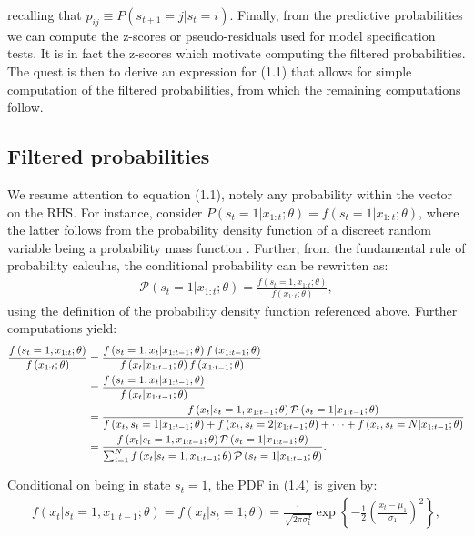 \documentclass[11pt,a4paper,oneside]{article}
\newcommand{\lp}{\left(}
\newcommand{\rp}{\right)}
\newcommand{\lc}{\left\{}
\newcommand{\rc}{\right\}}
\newcommand{\pp}{\mathcal{P}}
\begin{document}
recalling that $p_{ij} \equiv P\lp s_{t+1} = j \vert s_t = i\rp$. Finally, from the predictive probabilities we can compute the z-scores or pseudo-residuals used for model specification tests. It is in fact the z-scores which motivate computing the filtered probabilities. The quest is then to derive an expression for (1.1) that allows for simple computation of the filtered probabilities, from which the remaining computations follow.

\subsection{Filtered probabilities}
We resume attention to equation (1.1), notely any probability within the vector on the RHS. For instance, consider $P\lp s_t = 1\vert x_{1:t};\theta\rp = f\lp s_t = 1\vert x_{1:t};\theta\rp$, where the latter follows from the probability density function of a discreet random variable being a probability mass function \cite{grimmet}. Further, from the fundamental rule of probability calculus, the conditional probability can be rewritten as:
\begin{align}
    \pp\lp s_t = 1\vert x_{1:t};\theta\rp = \frac{f\lp s_t = 1, x_{1:t};\theta\rp}{ f\lp x_{1:t};\theta\rp},
\end{align}
using the definition of the probability density function referenced above. Further computations yield:
\begin{align}
    \frac{f\lp s_t = 1, x_{1:t};\theta\rp}{ f\lp x_{1:t};\theta\rp} 
        &= \frac{f\lp s_t = 1, x_t\vert x_{1:t-1};\theta\rp f\lp x_{1:t-1};\theta\rp}{ f\lp x_t\vert x_{1:t-1};\theta\rp f\lp x_{1:t-1};\theta\rp} \notag \\
        &= \frac{f\lp s_t = 1, x_t\vert x_{1:t-1};\theta\rp }{ f\lp x_t\vert x_{1:t-1};\theta\rp} \notag \\
        &= \frac{f\lp x_t\vert s_t = 1, x_{1:t-1};\theta\rp \pp\lp s_t = 1 \vert x_{1:t-1}; \theta\rp }{ f\lp x_t, s_t = 1\vert x_{1:t-1};\theta\rp + f\lp x_t, s_t = 2\vert x_{1:t-1};\theta\rp + \dots + f\lp x_t, s_t = N\vert x_{1:t-1};\theta\rp} \notag \\
        &= \frac{f\lp x_t\vert s_t = 1, x_{1:t-1};\theta\rp \pp\lp s_t = 1 \vert x_{1:t-1}; \theta\rp }{ \sum_{i=1}^N f\lp x_t\vert s_t = 1, x_{1:t-1};\theta\rp \pp\lp s_t = 1 \vert x_{1:t-1};\theta \rp}.
\end{align}

Conditional on being in state $s_t = 1$, the PDF in (1.4) is given by:
\begin{align}
    f\lp x_t \vert s_t = 1, x_{1:t-1}; \theta\rp = f\lp x_t \vert s_t = 1; \theta\rp = \frac{1}{\sqrt{2\pi\sigma_1^2}}\exp\lc - \frac{1}{2}\lp \frac{x_t - \mu_1}{\sigma_1}\rp^2\rc,
\end{align}
\end{document}
